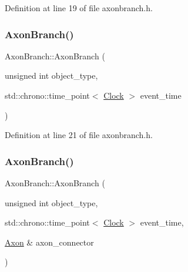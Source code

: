 Definition at line 19 of file axonbranch.\+h.

\mbox{\label{class_axon_branch_ad6191fcfd8bedc058a4f1cfb5056f5b2}} 
\subsubsection{\texorpdfstring{Axon\+Branch()}{AxonBranch()}\hspace{0.1cm}{\footnotesize\ttfamily [3/4]}}
{\footnotesize\ttfamily Axon\+Branch\+::\+Axon\+Branch (\begin{DoxyParamCaption}\item[{unsigned int}]{object\+\_\+type,  }\item[{std\+::chrono\+::time\+\_\+point$<$ \hyperlink{universe_8h_a0ef8d951d1ca5ab3cfaf7ab4c7a6fd80}{Clock} $>$}]{event\+\_\+time }\end{DoxyParamCaption})\hspace{0.3cm}{\ttfamily [inline]}}



Definition at line 21 of file axonbranch.\+h.

\mbox{\label{class_axon_branch_a98f33462edf82dacab750d1140172912}} 
\subsubsection{\texorpdfstring{Axon\+Branch()}{AxonBranch()}\hspace{0.1cm}{\footnotesize\ttfamily [4/4]}}
{\footnotesize\ttfamily Axon\+Branch\+::\+Axon\+Branch (\begin{DoxyParamCaption}\item[{unsigned int}]{object\+\_\+type,  }\item[{std\+::chrono\+::time\+\_\+point$<$ \hyperlink{universe_8h_a0ef8d951d1ca5ab3cfaf7ab4c7a6fd80}{Clock} $>$}]{event\+\_\+time,  }\item[{\hyperlink{class_axon}{Axon} \&}]{axon\+\_\+connector }\end{DoxyParamCaption})\hspace{0.3cm}{\ttfamily [inline]}}



